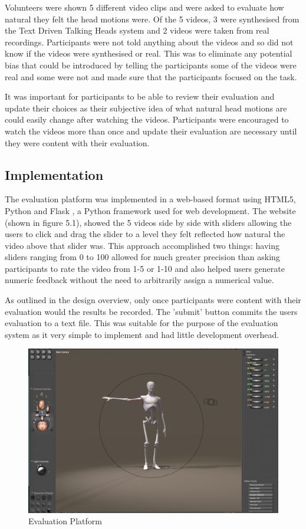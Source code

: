 \documentclass[bsc,frontabs,twoside,singlespacing,parskip]{infthesis}
\begin{document}
Volunteers were shown 5 different video clips and were asked to evaluate how natural they felt the head motions were. Of the 5 videos, 3 were synthesised from the Text Driven Talking Heads system and 2 videos were taken from real recordings. Participants were not told anything about the videos and so did not know if the videos were synthesised or real. This was to eliminate any potential bias that could be introduced by telling the participants some of the videos were real and some were not and made sure that the participants focused on the task.

It was important for participants to be able to review their evaluation and update their choices as their subjective idea of what natural head motions are could easily change after watching the videos. Participants were encouraged to watch the videos more than once and update their evaluation are necessary until they were content with their evaluation.

\subsection{Implementation}

The evaluation platform was implemented in a web-based format using HTML5, Python and Flask \cite{flask}, a Python framework used for web development. The website (shown in figure 5.1), showed the 5 videos side by side with sliders allowing the users to click and drag the slider to a level they felt reflected how natural the video above that slider was. This approach accomplished two things: having sliders ranging from 0 to 100 allowed for much greater precision than asking participants to rate the video from 1-5 or 1-10 and also helped users generate numeric feedback without the need to arbitrarily assign a numerical value.

As outlined in the design overview, only once participants were content with their evaluation would the results be recorded. The 'submit' button commits the users evaluation to a text file. This was suitable for the purpose of the evaluation system as it very simple to implement and had little development overhead.

\begin{figure}
	\centering
	\includegraphics[width=.7\textwidth]{poser.png}
	\caption{Evaluation Platform}
\end{figure}
\end{document}
